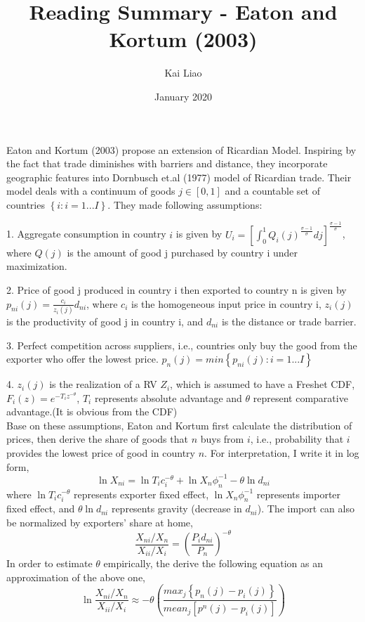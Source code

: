 \documentclass{article}
\begin{document}
\title{Reading Summary - Eaton and Kortum (2003)}
\author{Kai Liao}
\date{January 2020}



\maketitle

Eaton and Kortum (2003) propose an extension of Ricardian Model. Inspiring by the fact that trade diminishes with barriers and distance, they incorporate geographic features into Dornbusch et.al (1977) model of Ricardian trade. Their model deals with a continuum of goods $j \in [0, 1]$ and a countable set of countries $\left\{ i:i = 1...I \right\}$. They made following assumptions:

1. Aggregate consumption in country $i$ is given by $U_i=\left[\int_{0}^{1}Q_i(j)^\frac{\sigma-1}{\sigma}dj\right]^\frac{\sigma-1}{\sigma}$,  where $Q(j)$ is the amount of good j purchased by country i under maximization.

2. Price of good j produced in country i then exported to country n is given by $p_{ni}(j)=\frac{c_i}{z_i(j)}d_{ni}$, where $c_i$ is the homogeneous input price in country i, $z_i(j)$ is the productivity of good j in country i, and $d_{ni}$ is the distance or trade barrier.

3. Perfect competition across suppliers, i.e., countries only buy the good from the exporter who offer the lowest price.
$p_n(j) = min\left\{p_{ni}(j):i = 1...I\right\}$

4. $z_i(j)$ is the realization of a RV $Z_i$, which is assumed to have a Freshet CDF,
$F_i(z)=e^{-T_iz^{-\theta}}$,   $T_i$ represents absolute advantage and $\theta$ represent comparative advantage.(It is obvious from the CDF)
\\

Base on these assumptions, Eaton and Kortum first calculate the distribution of prices, then derive the share of goods that $n$  buys from $i$, i.e., probability that $i$ provides the lowest price of good in country $n$. For interpretation, I write it in log form,
$$\ln{X_{ni}} = \ln{T_ic_i^{-\theta}}+\ln{X_n\phi_n^{-1}-\theta\ln{d_{ni}}}$$
where  $\ln{T_ic_i^{-\theta}}$ represents exporter fixed effect, $\ln{X_n\phi_n^{-1}}$ represents importer fixed effect, and $\theta\ln{d_{ni}}$ represents gravity (decrease in $d_{ni}$). The import can also be normalized by exporters' share at home,
$$\frac{X_{ni}/{X_n}}{{X_{ii}}/{X_i}}=\left(\frac{P_id_{ni}}{P_n}\right)^{-\theta}$$
In order to estimate $\theta$ empirically, the derive the following equation as an approximation of the above one,
$$\ln{\frac{X_{ni}/{X_n}}{{X_{ii}}/{X_i}}}\approx-\theta\left(\frac{max_j\left\{p_n(j)-p_i(j)\right\}}{mean_j\left[p^n(j)-p_i(j)\right]}\right)$$
\end{document}
